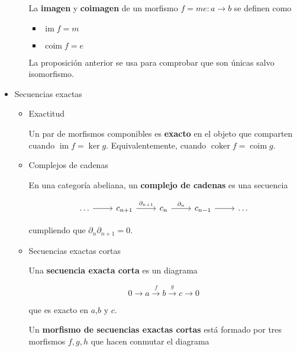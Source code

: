 \documentclass[11pt]{article}
\begin{document}
\begin{itemize}
\begin{itemize}
\begin{definition}
La \textbf{imagen} y \textbf{coimagen} de un morfismo $f = me \colon a \to b$ se definen como

\begin{itemize}
\item $\operatorname{im} f = m$
\item $\operatorname{coim} f = e$
\end{itemize}
\end{definition}

La proposición anterior se usa para comprobar que son únicas salvo
isomorfismo.
\end{itemize}

\item Secuencias exactas
\label{sec-7-5-4-5}
\begin{itemize}
\item Exactitud
\label{sec-7-5-4-5-1}
\begin{definition}
Un par de morfismos componibles es \textbf{exacto} en el objeto que comparten
cuando $\operatorname{im} f = \operatorname{ker} g$. Equivalentemente, cuando $\operatorname{coker} f = \operatorname{coim} g$.
\end{definition}

\item Complejos de cadenas
\label{sec-7-5-4-5-2}
\begin{definition}
En una categoría abeliana, un \textbf{complejo de cadenas} es una secuencia

\[\begin{tikzcd}
\dots \rar &
c_{n+1} \rar{\partial_{n+1}} &
c_n \rar{\partial_n} &
c_{n-1} \rar &
\dots
\end{tikzcd}\]

cumpliendo que $\partial_n\partial_{n+1} = 0$.
\end{definition}

\item Secuencias exactas cortas
\label{sec-7-5-4-5-3}
\begin{definition}
Una \textbf{secuencia exacta corta} es un diagrama

\[
0 \longrightarrow
a \overset{f}\longrightarrow
b \overset{g}\longrightarrow
c \longrightarrow
0
\]

que es exacto en $a$,$b$ y $c$.
\end{definition}

\begin{definition}
Un \textbf{morfismo de secuencias exactas cortas} está formado por tres morfismos
$f,g,h$ que hacen conmutar el diagrama


\end{definition}
\end{itemize}
\end{itemize}
\end{document}
